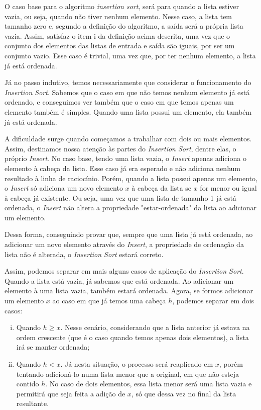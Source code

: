 \documentclass[a4paper, 10pt]{article}
\begin{document}
O caso base para o algoritmo \textit{insertion sort}, será para quando a lista estiver vazia, ou seja, quando não tiver nenhum elemento. Nesse caso, a lista tem tamanho zero e, segundo a definição do algoritmo, a saída será a própria lista vazia. Assim, satisfaz o item i da definição acima descrita, uma vez que o conjunto dos elementos das listas de entrada e saída são iguais, por ser um conjunto vazio. Esse caso é trivial, uma vez que, por ter nenhum elemento, a lista já está ordenada.

Já no passo indutivo, temos necessariamente que considerar o funcionamento do \textit{Insertion Sort}. Sabemos que o caso em que não temos nenhum elemento já está ordenado, e conseguimos ver também que o caso em que temos apenas um elemento também é simples. Quando uma lista possui um elemento, ela também já está ordenada.

A dificuldade surge quando começamos a trabalhar com dois ou mais elementos. Assim, destinamos nossa atenção às partes do \textit{Insertion Sort}, dentre elas, o próprio \textit{Insert}.
No caso base, tendo uma lista vazia, o \textit{Insert} apenas adiciona o elemento à cabeça da lista. Esse caso já era esperado e não adiciona nenhum resultado à linha de raciocínio. Porém, quando a lista possui apenas um elemento, o \textit{Insert} só adiciona um novo elemento $x$ à cabeça da lista se $x$ for menor ou igual à cabeça já existente. Ou seja, uma vez que uma lista de tamanho 1 já está ordenada, o \textit{Insert} não altera a propriedade "estar-ordenada" da lista ao adicionar um elemento.

Dessa forma, conseguindo provar que, sempre que uma lista já está ordenada, ao adicionar um novo elemento através do \textit{Insert}, a propriedade de ordenação da lista não é alterada, o \textit{Insertion Sort} estará correto.

Assim, podemos separar em mais alguns casos de aplicação do \textit{Insertion Sort}. Quando a lista está vazia, já sabemos que está ordenada. Ao adicionar um elemento à uma lista vazia, também estará ordenada. Agora, se formos adicionar um elemento $x$ ao caso em que já temos uma cabeça $h$, podemos separar em dois casos:

\begin{enumerate}[i)]
	\item Quando $h \geq x$. Nesse cenário, considerando que a lista anterior já estava na ordem crescente (que é o caso quando temos apenas dois elementos), a lista irá se manter ordenada;
    \item Quando $h < x$. Já nesta situação, o processo será reaplicado em $x$, porém tentando adicioná-lo numa lista menor que a original, em que não esteja contido $h$. No caso de dois elementos, essa lista menor será uma lista vazia e permitirá que seja feita a adição de $x$, só que dessa vez no final da lista resultante.
\end{enumerate}
\end{document}
